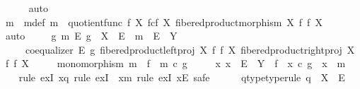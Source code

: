 \begin{isabellebody}
\ \ \ \ \isamarkupfalse%
\ auto\isanewline
\ \ \isamarkupfalse%
\ m\ \ m{\isacharunderscore}{\kern0pt}def{\isacharcolon}{\kern0pt}\ {\isachardoublequoteopen}m\ {\isacharequal}{\kern0pt}\ quotient{\isacharunderscore}{\kern0pt}func\ f\ {\isacharparenleft}{\kern0pt}X\ \isactrlbsub f\isactrlesub {\isasymtimes}\isactrlsub c\isactrlbsub f\isactrlesub \ X{\isacharcomma}{\kern0pt}\ fibered{\isacharunderscore}{\kern0pt}product{\isacharunderscore}{\kern0pt}morphism\ X\ f\ f\ X{\isacharparenright}{\kern0pt}{\isachardoublequoteclose}\isanewline
\ \ \ \ \isamarkupfalse%
\ auto\isanewline
\ \ \isamarkupfalse%
\ {\isachardoublequoteopen}{\isasymexists}\ g\ m\ E{\isachardot}{\kern0pt}\ g\ {\isacharcolon}{\kern0pt}\ X\ {\isasymrightarrow}\ E\ {\isasymand}\ m\ {\isacharcolon}{\kern0pt}\ E\ {\isasymrightarrow}\ Y\ \isanewline
\ \ \ \ {\isasymand}\ coequalizer\ E\ g\ {\isacharparenleft}{\kern0pt}fibered{\isacharunderscore}{\kern0pt}product{\isacharunderscore}{\kern0pt}left{\isacharunderscore}{\kern0pt}proj\ X\ f\ f\ X{\isacharparenright}{\kern0pt}\ {\isacharparenleft}{\kern0pt}fibered{\isacharunderscore}{\kern0pt}product{\isacharunderscore}{\kern0pt}right{\isacharunderscore}{\kern0pt}proj\ X\ f\ f\ X{\isacharparenright}{\kern0pt}\isanewline
\ \ \ \ {\isasymand}\ monomorphism\ m\ {\isasymand}\ f\ {\isacharequal}{\kern0pt}\ m\ {\isasymcirc}\isactrlsub c\ g\isanewline
\ \ \ \ {\isasymand}\ {\isacharparenleft}{\kern0pt}{\isasymforall}x{\isachardot}{\kern0pt}\ x\ {\isacharcolon}{\kern0pt}\ E\ {\isasymrightarrow}\ Y\ {\isasymlongrightarrow}\ f\ {\isacharequal}{\kern0pt}\ x\ {\isasymcirc}\isactrlsub c\ g\ {\isasymlongrightarrow}\ x\ {\isacharequal}{\kern0pt}\ m{\isacharparenright}{\kern0pt}{\isachardoublequoteclose}\isanewline
\ \ \isamarkupfalse%
\ {\isacharparenleft}{\kern0pt}rule\ exI{\isacharbrackleft}{\kern0pt}\ x{\isacharequal}{\kern0pt}q{\isacharbrackright}{\kern0pt}{\isacharcomma}{\kern0pt}\ rule\ exI\ {\isacharbrackleft}{\kern0pt}\ x{\isacharequal}{\kern0pt}m{\isacharbrackright}{\kern0pt}{\isacharcomma}{\kern0pt}\ rule\ exI{\isacharbrackleft}{\kern0pt}\ x{\isacharequal}{\kern0pt}E{\isacharbrackright}{\kern0pt}{\isacharcomma}{\kern0pt}\ safe{\isacharparenright}{\kern0pt}\isanewline
\ \ \ \ \isamarkupfalse%
\ q{\isacharunderscore}{\kern0pt}type{\isacharbrackleft}{\kern0pt}type{\isacharunderscore}{\kern0pt}rule{\isacharbrackright}{\kern0pt}{\isacharcolon}{\kern0pt}\ {\isachardoublequoteopen}q\ {\isacharcolon}{\kern0pt}\ X\ {\isasymrightarrow}\ E{\isachardoublequoteclose}\isanewline

\end{isabellebody}
